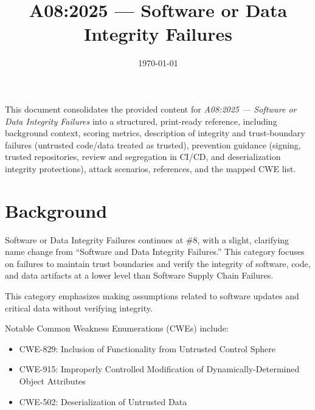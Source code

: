 \documentclass[11pt]{article}
\title{\textbf{A08:2025 — Software or Data Integrity Failures}}
\date{\today}
\begin{document}
\maketitle

\begin{infobox}
This document consolidates the provided content for \textit{A08:2025 — Software or Data Integrity Failures} into a structured, print-ready reference, including background context, scoring metrics, description of integrity and trust-boundary failures (untrusted code/data treated as trusted), prevention guidance (signing, trusted repositories, review and segregation in CI/CD, and deserialization integrity protections), attack scenarios, references, and the mapped CWE list.
\end{infobox}

\tableofcontents
\newpage

\section{Background}
Software or Data Integrity Failures continues at \#8, with a slight, clarifying name change from ``Software and Data Integrity Failures.'' This category focuses on failures to maintain trust boundaries and verify the integrity of software, code, and data artifacts at a lower level than Software Supply Chain Failures.

This category emphasizes making assumptions related to software updates and critical data without verifying integrity.

Notable Common Weakness Enumerations (CWEs) include:
\begin{itemize}
  \item CWE-829: Inclusion of Functionality from Untrusted Control Sphere
  \item CWE-915: Improperly Controlled Modification of Dynamically-Determined Object Attributes
  \item CWE-502: Deserialization of Untrusted Data
\end{itemize}
\end{document}
